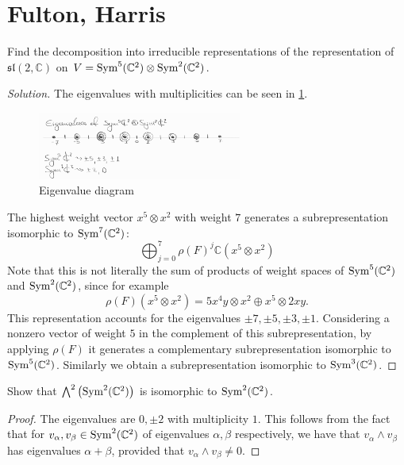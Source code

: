 \documentclass{report}
\begin{document}
\section{Fulton, Harris}
\begin{exercise}[Exercise 11.1]
    Find the decomposition into irreducible representations of the representation of $\mathfrak{sl}(2, \mathbb C)$ on $V = \operatorname{Sym}^5(\mathbb C^2)\otimes \operatorname{Sym}^2(\mathbb C^2)$.
\end{exercise}
\begin{proof}[Solution]
    The eigenvalues with multiplicities can be seen in \cref{fig:eigenvalue_diagram}.
    \begin{figure}[h]
        \centering
        \includegraphics[width=0.6\textwidth]{eigenvalues_of_tensor_product.jpg}
        \caption{Eigenvalue diagram}
        \label{fig:eigenvalue_diagram}
    \end{figure}
    The highest weight vector $x^5 \otimes x^2$ with weight $7$ generates a subrepresentation isomorphic to $\operatorname{Sym}^7(\mathbb C^2)$:
    \[
    \bigoplus_{j = 0}^7 \rho(F)^j \mathbb C (x^5 \otimes x^2)
    \]
    Note that this is not literally the sum of products of weight spaces of $\operatorname{Sym}^5(\mathbb C^2)$ and $\operatorname{Sym}^2(\mathbb C^2)$, since for example
    \[
    \rho(F) (x^5 \otimes x^2) = 5x^4 y \otimes x^2 \oplus x^5 \otimes 2xy.
    \]
    This representation accounts for the eigenvalues $\pm 7, \pm 5, \pm 3, \pm 1$.
    Considering a nonzero vector of weight $5$ in the complement of this subrepresentation, by applying $\rho(F)$ it generates a complementary subrepresentation isomorphic to $\operatorname{Sym}^5(\mathbb C^2)$.
    Similarly we obtain a subrepresentation isomorphic to $\operatorname{Sym}^3(\mathbb C^2)$.
\end{proof}
\begin{exercise}[Exercise 11.3]
    Show that $\bigwedge^2\left(\operatorname{Sym}^2(\mathbb C^2)\right)$ is isomorphic to $\operatorname{Sym}^2(\mathbb C^2)$.
\end{exercise}
\begin{proof}
    The eigenvalues are $0, \pm 2$ with multiplicity $1$.
    This follows from the fact that for $v_\alpha, v_\beta \in \operatorname{Sym}^2(\mathbb C^2)$ of eigenvalues $\alpha, \beta$ respectively, we have that $v_\alpha \wedge v_\beta$ has eigenvalues $\alpha + \beta$, provided that $v_\alpha \wedge v_\beta \neq 0$. 
\end{proof}
\end{document}
